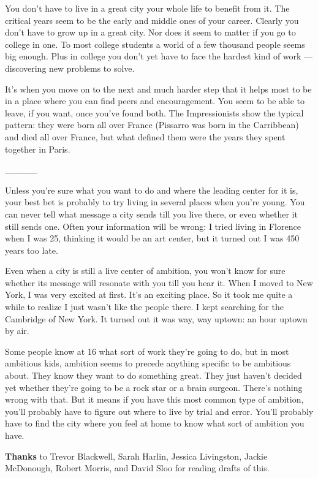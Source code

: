 You don't have to live in a great city your whole life to benefit from
it. The critical years seem to be the early and middle ones of your
career. Clearly you don't have to grow up in a great city. Nor does it
seem to matter if you go to college in one. To most college students a
world of a few thousand people seems big enough. Plus in college you
don't yet have to face the hardest kind of work --- discovering new
problems to solve.

It's when you move on to the next and much harder step that it helps
most to be in a place where you can find peers and encouragement. You
seem to be able to leave, if you want, once you've found both. The
Impressionists show the typical pattern: they were born all over France
(Pissarro was born in the Carribbean) and died all over France, but what
defined them were the years they spent together in Paris.

\_\_\_\_\_

Unless you're sure what you want to do and where the leading center for
it is, your best bet is probably to try living in several places when
you're young. You can never tell what message a city sends till you live
there, or even whether it still sends one. Often your information will
be wrong: I tried living in Florence when I was 25, thinking it would be
an art center, but it turned out I was 450 years too late.

Even when a city is still a live center of ambition, you won't know for
sure whether its message will resonate with you till you hear it. When I
moved to New York, I was very excited at first. It's an exciting place.
So it took me quite a while to realize I just wasn't like the people
there. I kept searching for the Cambridge of New York. It turned out it
was way, way uptown: an hour uptown by air.

Some people know at 16 what sort of work they're going to do, but in
most ambitious kids, ambition seems to precede anything specific to be
ambitious about. They know they want to do something great. They just
haven't decided yet whether they're going to be a rock star or a brain
surgeon. There's nothing wrong with that. But it means if you have this
most common type of ambition, you'll probably have to figure out where
to live by trial and error. You'll probably have to find the city where
you feel at home to know what sort of ambition you have.


\textbf{Thanks} to Trevor Blackwell, Sarah Harlin, Jessica Livingston,
Jackie McDonough, Robert Morris, and David Sloo for reading drafts of
this.